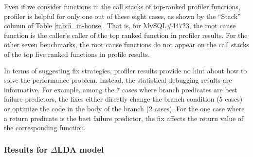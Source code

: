 Even if we consider functions in the call stacks of top-ranked
profiler functions, profiler is helpful for only one out of these eight cases,
as shown by the ``Stack'' column of Table \ref{tab:5_in-house}. That is, for
MySQL\#44723, the root cause function is the caller's caller of the top ranked
function in profiler results. For the other seven benchmarks, the root
cause functions do not appear on the call stacks of the top five ranked 
functions in profile results.

In terms of suggesting fix strategies, profiler results provide no hint
about how to solve the performance problem. Instead, the statistical debugging
results are informative.
For example, among the 7 cases where branch predicates are 
best failure predictors, the fixes either directly change the branch condition 
(5 cases) or optimize the code in the body of the branch (2 cases).
For the one case where a return predicate is the best failure predictor,
the fix affects the return value of the corresponding function.


\subsubsection{Results for $\Delta$LDA model}
\label{sec:5_deltalda_results}





